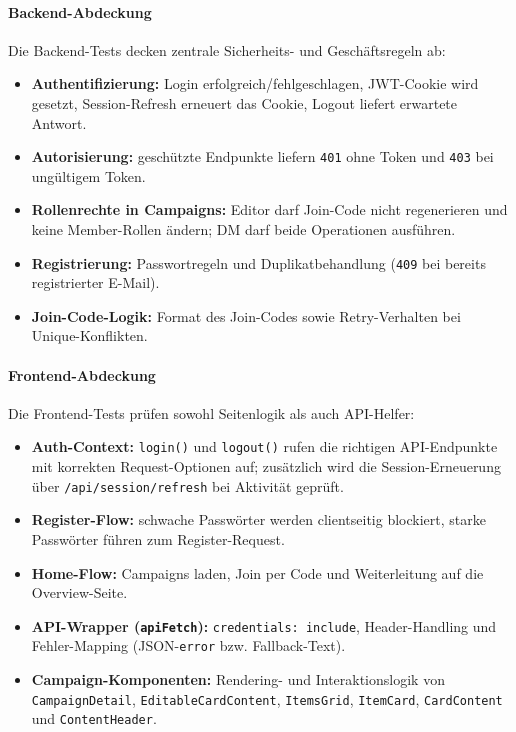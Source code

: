 \paragraph{Backend-Abdeckung}
Die Backend-Tests decken zentrale Sicherheits- und Geschäftsregeln ab:
\begin{itemize}
  \item \textbf{Authentifizierung:} Login erfolgreich/fehlgeschlagen,
  JWT-Cookie wird gesetzt, Session-Refresh erneuert das Cookie, Logout liefert erwartete Antwort.
  \item \textbf{Autorisierung:} geschützte Endpunkte liefern
  \texttt{401} ohne Token und \texttt{403} bei ungültigem Token.
  \item \textbf{Rollenrechte in Campaigns:}
  Editor darf Join-Code nicht regenerieren und keine Member-Rollen ändern;
  DM darf beide Operationen ausführen.
  \item \textbf{Registrierung:} Passwortregeln und Duplikatbehandlung
  (\texttt{409} bei bereits registrierter E-Mail).
  \item \textbf{Join-Code-Logik:} Format des Join-Codes sowie Retry-Verhalten
  bei Unique-Konflikten.
\end{itemize}

\paragraph{Frontend-Abdeckung}
Die Frontend-Tests prüfen sowohl Seitenlogik als auch API-Helfer:
\begin{itemize}
  \item \textbf{Auth-Context:} \texttt{login()} und \texttt{logout()} rufen die
  richtigen API-Endpunkte mit korrekten Request-Optionen auf;
  zusätzlich wird die Session-Erneuerung über \texttt{/api/session/refresh}
  bei Aktivität geprüft.
  \item \textbf{Register-Flow:} schwache Passwörter werden clientseitig blockiert,
  starke Passwörter führen zum Register-Request.
  \item \textbf{Home-Flow:} Campaigns laden, Join per Code und Weiterleitung auf
  die Overview-Seite.
  \item \textbf{API-Wrapper (\texttt{apiFetch}):} \texttt{credentials: include},
  Header-Handling und Fehler-Mapping (JSON-\texttt{error} bzw. Fallback-Text).
  \item \textbf{Campaign-Komponenten:} Rendering- und Interaktionslogik von
  \texttt{CampaignDetail}, \texttt{EditableCardContent}, \texttt{ItemsGrid},
  \texttt{ItemCard}, \texttt{CardContent} und \texttt{ContentHeader}.
\end{itemize}

